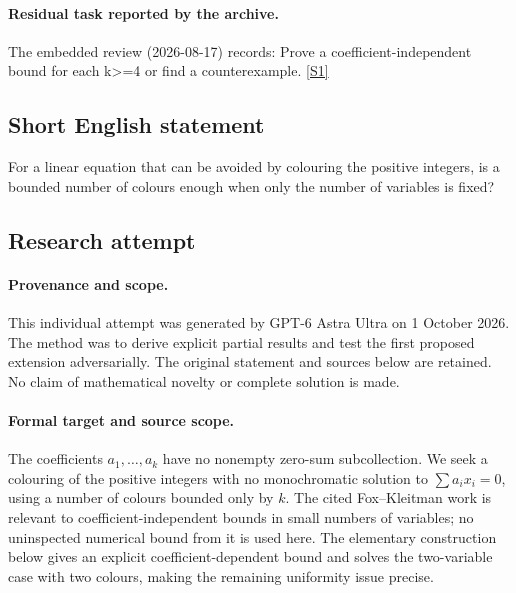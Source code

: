 \documentclass[11pt,a4paper]{article}
\newcommand{\sref}[2]{\hyperlink{source:#1:#2}{[S#2]}}
\begin{document}
\paragraph{Residual task reported by the archive.}

The embedded review (2026-08-17) records: Prove a coefficient-independent bound for each k>=4 or find a counterexample. \sref{153}{1}

\subsection{Short English statement}

For a linear equation that can be avoided by colouring the positive integers, is a bounded number of colours enough when only the number of variables is fixed?

\subsection{Research attempt}

\paragraph{Provenance and scope.}
This individual attempt was generated by GPT-6 Astra Ultra on 1 October 2026. The method was to derive explicit partial results and test the first proposed extension adversarially. The original statement and sources below are retained. No claim of mathematical novelty or complete solution is made.

\paragraph{Formal target and source scope.}
The coefficients $a_1,\ldots,a_k$ have no nonempty zero-sum subcollection. We seek a colouring of the positive integers with no monochromatic solution to $\sum a_ix_i=0$, using a number of colours bounded only by $k$. The cited Fox--Kleitman work is relevant to coefficient-independent bounds in small numbers of variables; no uninspected numerical bound from it is used here. The elementary construction below gives an explicit coefficient-dependent bound and solves the two-variable case with two colours, making the remaining uniformity issue precise.
\end{document}
